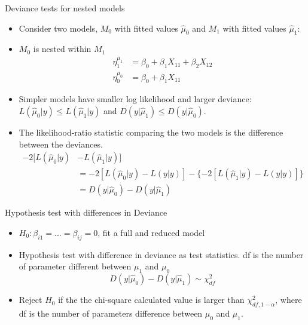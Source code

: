 \documentclass[ignorenonframetext,]{beamer}
\providecommand{\tightlist}{%
  \setlength{\itemsep}{0pt}\setlength{\parskip}{0pt}}
\begin{document}
\begin{frame}{Deviance tests for nested models}

\begin{itemize}
\item
  Consider two models, \(M_0\) with fitted values \(\hat\mu_0\) and
  \(M_1\) with fitted values \(\hat\mu_1\):
\item
  \(M_0\) is nested within \(M_1\) \[
  \begin{aligned}
  \eta_1^{\mu_1} &= \beta_0+\beta_1X_{11}+\beta_2X_{12} \\
  \eta_0^{\mu_0} &= \beta_0+\beta_1X_{11}
  \end{aligned}
  \]
\item
  Simpler models have smaller log likelihood and larger deviance:
  \(L(\hat\mu_0|y) \le L(\hat\mu_1|y)\) and
  \(D(y|\hat\mu_1) \le D(y|\hat\mu_0)\).
\item
  The likelihood-ratio statistic comparing the two models is the
  difference between the deviances.\\
  \[\begin{aligned}
  -2[L(\hat\mu_0|y)&-L(\hat\mu_1|y)]\\
  &=-2[L(\hat\mu_0|y)-L(y|y)]- \{-2[L(\hat\mu_1|y)-L(y|y)]\}\\
  &=D(y|\hat\mu_0) - D(y|\hat\mu_1)
  \end{aligned}\]
\end{itemize}

\end{frame}

\begin{frame}{Hypothesis test with differences in Deviance}

\begin{itemize}
\tightlist
\item
  \(H_0: \beta_{i1}=...=\beta_{ij} =0\), fit a full and reduced model
\item
  Hypothesis test with difference in deviance as test statistics. df is
  the number of parameter different between \(\mu_1\) and \(\mu_0\) \[
  D(y|\hat\mu_0)-D(y|\hat\mu_1) \sim\chi^2_{df}
  \]
\item
  Reject \(H_0\) if the the chi-square calculated value is larger than
  \(\chi^2_{df, 1-\alpha}\), where df is the number of parameters
  difference between \(\mu_0\) and \(\mu_1\).
\end{itemize}

\end{frame}
\end{document}
